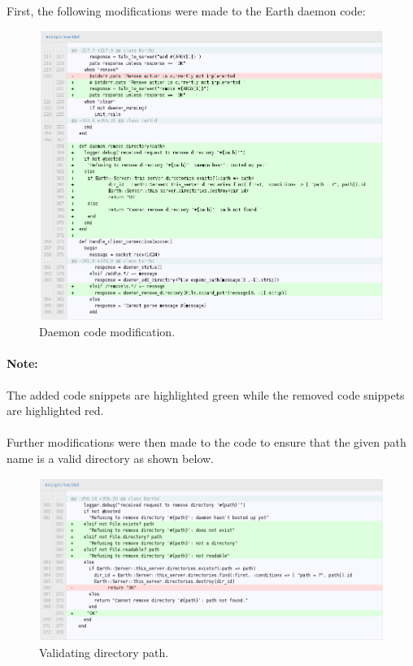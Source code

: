 \documentclass[10pt,a4,oneside]{article}
\begin{document}
\paragraph{}
First, the following modifications were made to the Earth daemon code:


\begin{figure}[h!]
\begin{centering}
\includegraphics[width=150mm]{figs/earthd}
\end{centering}
\caption{Daemon code modification.}
\label{fig:earthd}
\end{figure}


\paragraph{Note:}
The added code snippets are highlighted green while the removed code 
snippets are highlighted red.


\newpage

\paragraph{}
Further modifications were then made to the code to ensure that the given 
path name is a valid directory as shown below.

\begin{figure}[h!]
\begin{centering}
\includegraphics[width=150mm]{figs/earthd2}
\end{centering}
\caption{Validating directory path.}
\label{fig:earthd2}
\end{figure}
\end{document}
